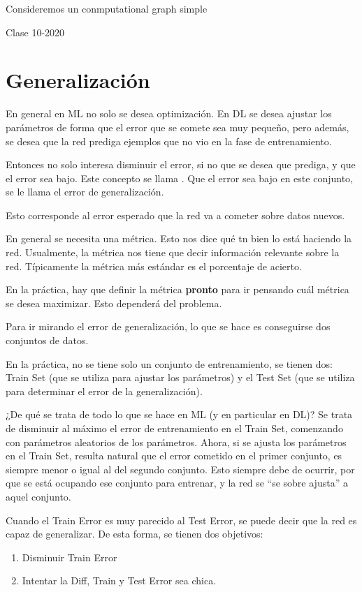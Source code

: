 Consideremos un conmputational graph simple







\newpage
Clase 10-2020

\section{Generalización}

En general en ML no solo se desea optimización. En DL se desea ajustar los parámetros de forma que el error que se comete sea muy pequeño, pero además, se desea que la red prediga ejemplos que no vio en la fase de entrenamiento.

Entonces no solo interesa disminuir el error, si no que se desea que prediga, y que el error sea bajo. Este concepto se llama . Que el error sea bajo en este conjunto, se le llama el error de generalización.

Esto corresponde al error esperado que la red va a cometer sobre datos nuevos.

En general se necesita una métrica. Esto nos dice qué tn bien lo está haciendo la red. Usualmente, la métrica nos tiene que decir información relevante sobre la red. Típicamente la métrica más estándar es el porcentaje de acierto.

En la práctica, hay que definir la métrica \textbf{pronto} para ir pensando cuál métrica se desea maximizar. Esto dependerá del problema.

Para ir mirando el error de generalización, lo que se hace es conseguirse dos conjuntos de datos.

En la práctica, no se tiene solo un conjunto de entrenamiento, se tienen dos: Train Set (que se utiliza para ajustar los parámetros) y el Test Set (que se utiliza para determinar el error de la generalización).

¿De qué se trata de todo lo que se hace en ML (y en particular en DL)? Se trata de disminuir al máximo el error de entrenamiento en el Train Set, comenzando con parámetros aleatorios de los parámetros. Ahora, si se ajusta los parámetros en el Train Set, resulta natural que el error cometido en el primer conjunto, es siempre menor o igual al del segundo conjunto. Esto siempre debe de ocurrir, por que se está ocupando ese conjunto para entrenar, y la red se ``se sobre ajusta'' a aquel conjunto.

Cuando el Train Error es muy parecido al Test Error, se puede decir que la red es capaz de generalizar. De esta forma, se tienen dos objetivos:
\begin{enumerate}
    \item Disminuir Train Error
    \item Intentar la Diff, Train y Test Error sea chica.
\end{enumerate}

